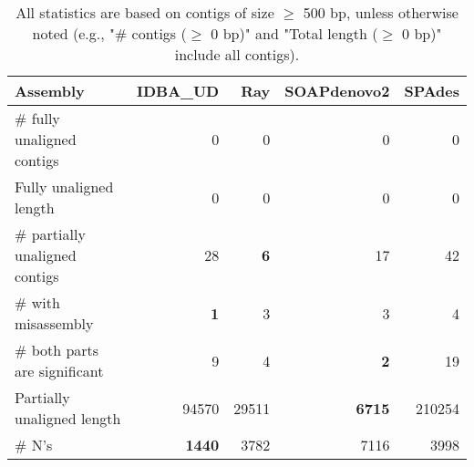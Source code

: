 \documentclass[12pt,a4paper]{article}
\begin{document}
\begin{table}[ht]
\begin{center}
\caption{All statistics are based on contigs of size $\geq$ 500 bp, unless otherwise noted (e.g., "\# contigs ($\geq$ 0 bp)" and "Total length ($\geq$ 0 bp)" include all contigs).}
\begin{tabular}{|l*{4}{|r}|}
\hline
Assembly & IDBA\_UD & Ray & SOAPdenovo2 & SPAdes \\ \hline
\# fully unaligned contigs & 0 & 0 & 0 & 0 \\ \hline
Fully unaligned length & 0 & 0 & 0 & 0 \\ \hline
\# partially unaligned contigs & 28 & {\bf 6} & 17 & 42 \\ \hline
\hspace{5mm}\# with misassembly & {\bf 1} & 3 & 3 & 4 \\ \hline
\hspace{5mm}\# both parts are significant & 9 & 4 & {\bf 2} & 19 \\ \hline
Partially unaligned length & 94570 & 29511 & {\bf 6715} & 210254 \\ \hline
\# N's & {\bf 1440} & 3782 & 7116 & 3998 \\ \hline
\end{tabular}
\end{center}
\end{table}
\end{document}
